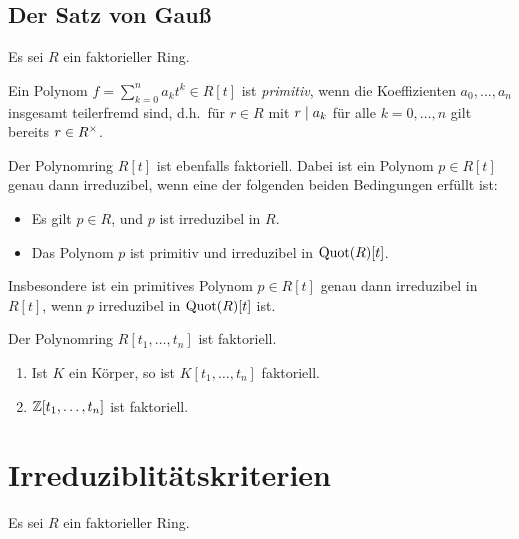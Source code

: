 \subsection{Der Satz von Gauß}

Es sei $R$ ein faktorieller Ring.

\begin{definition}
  Ein Polynom $f = \sum_{k=0}^n a_k t^k \in R[t]$ ist \emph{primitiv}, wenn die Koeffizienten $a_0, \dotsc, a_n$ insgesamt teilerfremd sind, d.h.\ für $r \in R$ mit $r \mathrel{|} a_k$ für alle $k = 0, \dotsc, n$ gilt bereits $r \in R^{\times}$.
\end{definition}

\begin{theorem}
  Der Polynomring $R[t]$ ist ebenfalls faktoriell.
  Dabei ist ein Polynom $p \in R[t]$ genau dann irreduzibel, wenn eine der folgenden beiden Bedingungen erfüllt ist:
  \begin{itemize}
    \item
      Es gilt $p \in R$, und $p$ ist irreduzibel in $R$.
    \item
      Das Polynom $p$ ist primitiv und irreduzibel in $\operatorname{Quot}(R)[t]$.
  \end{itemize}
  Insbesondere ist ein primitives Polynom $p \in R[t]$ genau dann irreduzibel in $R[t]$, wenn $p$ irreduzibel in $\operatorname{Quot}(R)[t]$ ist.
\end{theorem}

\begin{corollary}
  Der Polynomring $R[t_1, \dotsc, t_n]$ ist faktoriell.
\end{corollary}

\begin{example}
  \begin{enumerate}
    \item
      Ist $K$ ein Körper, so ist $K[t_1, \dotsc, t_n]$ faktoriell.
    \item
      $\mathbb{Z}[t_1, \dotsc, t_n]$ ist faktoriell.
  \end{enumerate}
\end{example}





\section{Irreduziblitätskriterien}

Es sei $R$ ein faktorieller Ring.

